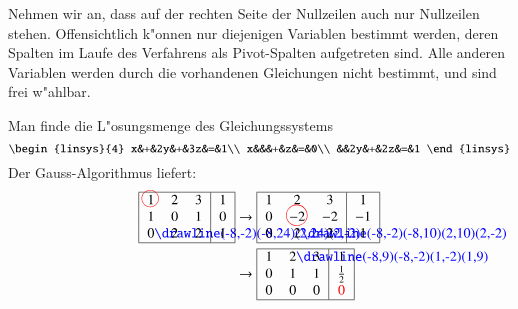 Nehmen wir an, dass auf der rechten Seite der Nullzeilen auch
nur Nullzeilen stehen.
Offensichtlich k"onnen nur diejenigen Variablen bestimmt werden,
deren Spalten im Laufe des Verfahrens als Pivot-Spalten aufgetreten sind.
Alle anderen Variablen werden durch die vorhandenen Gleichungen nicht
bestimmt, und sind frei w"ahlbar. 

\begin{beispiel}
Man finde die L"osungsmenge des Gleichungssystems
\[
\begin{linsys}{4}
x&+&2y&+&3z&=&1\\
x&&&+&z&=&0\\
 &&2y&+&2z&=&1
\end{linsys}
\]
Der Gauss-Algorithmus liefert:
\begin{align*}
\begin{tabular}{|>{$}c<{$}>{$}c<{$}>{$}c<{$}|>{$}c<{$}|}
\hline
1%
\begin{picture}(0,0)
\color{red}\put(-3,4){\circle{12}}
\end{picture}%
&2&3&1\\
1&0&1&0\\
0%
\begin{picture}(0,0)
\color{blue}\drawline(-8,-2)(-8,24)(2,24)(2,-2)
\end{picture}%
&2&2&1\\
\hline
\end{tabular}
&\rightarrow
\begin{tabular}{|>{$}c<{$}>{$}c<{$}>{$}c<{$}|>{$}c<{$}|}
\hline
1&2&3&1\\
0&-2%
\begin{picture}(0,0)
\color{red}\put(-6,4){\circle{15}}
\end{picture}%
&-2&-1\\
0&2%
\begin{picture}(0,0)
\color{blue}\drawline(-8,-2)(-8,10)(2,10)(2,-2)
\end{picture}%
&2&1\\
\hline
\end{tabular}
\\
&\rightarrow
\begin{tabular}{|>{$}c<{$}>{$}c<{$}>{$}c<{$}|>{$}c<{$}|}
\hline
1&2%
\begin{picture}(0,0)
\color{blue}\drawline(-8,9)(-8,-2)(1,-2)(1,9)
\end{picture}%
&3&1\\
0&1&1&\frac12\\
0&0&0&\color{red}0\\
\hline
\end{tabular}

\end{align*}
\end{beispiel}
